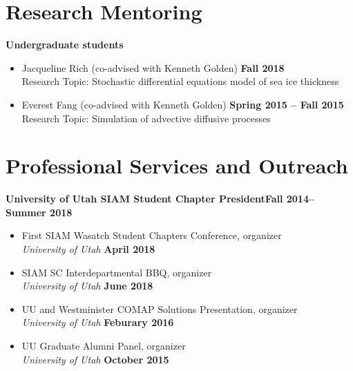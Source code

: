 \documentclass[margin,line]{res}
\begin{document}
\begin{resume}
\section{\sc Research Mentoring}
{\bf Undergraduate students}
\begin{itemize}
\item[ ] Jacqueline Rich (co-advised with Kenneth Golden) 
\hfill {\bf Fall 2018} \\
Research Topic: Stochastic differential equations model of sea ice thickness
\item[ ] Everest Fang (co-advised with Kenneth Golden)
\hfill {\bf Spring 2015 -- Fall 2015}\\
Research Topic: Simulation of advective diffusive processes
\end{itemize}

\section{\sc Professional Services and Outreach}

{\bf University of Utah SIAM Student Chapter President}\hfill{\bf Fall 2014--Summer 2018}
\begin{itemize}
\item[ ] First SIAM Wasatch Student Chapters Conference, organizer
\\ {\it University of Utah} \hfill {\bf April 2018}
\item[ ] SIAM SC Interdepartmental BBQ, organizer
\\ {\it University of Utah} \hfill {\bf June 2018}
\item[ ] UU and Westminister COMAP Solutions Presentation, organizer
\\ {\it University of Utah} \hfill {\bf Feburary 2016}
\item[ ] UU Graduate Alumni Panel, organizer 
\\ {\it University of Utah} \hfill {\bf October 2015}
\end{itemize}


\end{resume}
\end{document}
